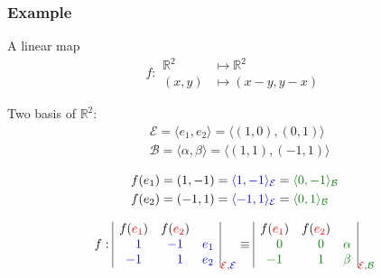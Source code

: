\documentclass{beamer}
\begin{document}
\begin{frame}
  \frametitle{Example}
  \begin{exampleblock}{A linear map}
    \[f: \begin{aligned} \mathbb{R}^2 &\mapsto \mathbb{R}^2\\ (x,y) &\mapsto (x - y, y - x) \end{aligned}\]

    Two basis of $\mathbb{R}^2 :$
    \[\begin{aligned}
    &\mathcal{E} = \langle e_1, e_2 \rangle = \langle (1,0), (0,1) \rangle \\ 
    &\mathcal{B} = \langle \alpha, \beta \rangle = \langle (1,1), (-1, 1) \rangle\\
    \end{aligned}
    \]
    \[
    \begin{aligned}
      &f(e_1) = (1,-1) = {\color{blue} \langle 1, -1 \rangle_{\mathcal{E}}} = {\color{darkgreen} \langle 0, -1\rangle_{\mathcal{B}}}\\
      &f(e_2) = (-1, 1) = {\color{blue} \langle -1, 1 \rangle_{\mathcal{E}}} = {\color{darkgreen} \langle 0, 1 \rangle_{\mathcal{B}}} \\      
    \end{aligned}
    \]


    \[f:
    \begin{array}{|ccc|}
      f({\color{red}e_1}) & f({\color{red}e_2}) & \\
      \color{blue}\phantom{-}1 & \color{blue} -1 & \color{blue} e_1\\
      \color{blue}-1 & \color{blue} \phantom{-}1 & \color{blue} e_2
    \end{array}_{{\color{red}\mathcal{E}}, {\color{blue}\mathcal{E}}}
    \equiv
    \begin{array}{|ccc|}
      f({\color{red}e_1}) & f({\color{red}e_2}) & \\
      \color{darkgreen}\phantom{-}0 & \color{darkgreen} \phantom{-}0 & \color{darkgreen} \alpha\\
      \color{darkgreen} -1 & \color{darkgreen}\phantom{-}1 & \color{darkgreen} \beta
    \end{array}_{{\color{red}\mathcal{E}}, {\color{darkgreen} \mathcal{B} }}
    \]

    
  \end{exampleblock}
\end{frame}
\end{document}
